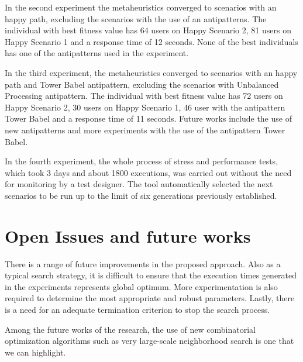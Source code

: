 In the second experiment the metaheuristics converged to scenarios with an happy path, excluding the scenarios with the use of an antipatterns. The individual with best fitness value has 64 users on Happy Scenario 2, 81 users on Happy Scenario 1 and a response time of 12 seconds. None of the best individuals has one of the antipatterns used in the experiment.


In the third experiment,  the metaheuristics converged to scenarios with an happy path and Tower Babel antipattern, excluding the scenarios with Unbalanced Processing antipattern. The individual with best fitness value has 72 users on Happy Scenario 2, 30 users on Happy Scenario 1, 46 user with the antipattern Tower Babel and a response time of 11 seconds. Future works include the use of new antipatterns and more experiments with the use of the antipattern Tower Babel.

In the fourth experiment, the whole process of stress and performance tests, which took 3 days and about 1800 executions, was carried out without the need for monitoring by a test designer. The tool automatically selected the next scenarios to be run up to the limit of six generations previously established. 

\section{Open Issues and future works}

There is a range of future improvements in the proposed approach. Also as a typical search strategy, it is difficult to ensure that the execution times generated in the experiments represents global optimum. More experimentation is also required to determine the
most appropriate and robust parameters. Lastly, there is a need for an adequate termination criterion to stop the search process.


Among the future works of the research, the use of new combinatorial optimization algorithms such as very large-scale neighborhood search is one that we can highlight. 
